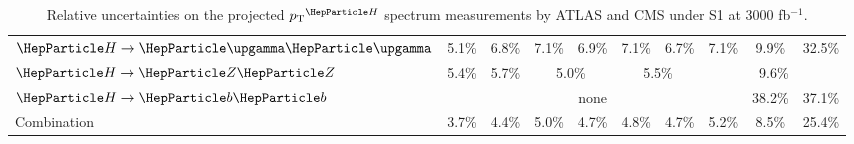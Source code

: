 \begin{table}[th]
{\begin{tabular}{l|cccccccc|c|c|c|c|c|c|c|c}
    \hline
    $\hgg$       & \multicolumn{4}{c|}{5.1\%} & \multicolumn{4}{c|}{6.8\%} & 7.1\%                      & \multicolumn{2}{c|}{6.9\%} & 7.1\%  & 6.7\%   & 7.1\%   & 9.9\%   & 32.5\%                                           \\     
    $\hzz$       & \multicolumn{4}{c|}{5.4\%} & \multicolumn{4}{c|}{5.7\%} & \multicolumn{3}{c|}{5.0\%} & \multicolumn{2}{c|}{5.5\%} & \multicolumn{3}{c}{9.6\%}                                                               \\ 
    $\hbb$       & \multicolumn{14}{c|}{none} & 38.2\%                     & 37.1\%                                                                                                                                            \\ 
    Combination  & \multicolumn{4}{c|}{3.7\%} & \multicolumn{4}{c|}{4.4\%} & 5.0\%                      & \multicolumn{2}{c|}{4.7\%} & 4.8\%  & 4.7\%   & 5.2\%   & 8.5\%   & 25.4\%                                           \\
    \hline
  \end{tabular}
  }
  \caption{Relative uncertainties on the projected $\pTH$ spectrum measurements by ATLAS and CMS under S1 at 3000 fb$^{-1}$.}
  \label{tab:proj_pth_unc_scen1}
\end{table}


